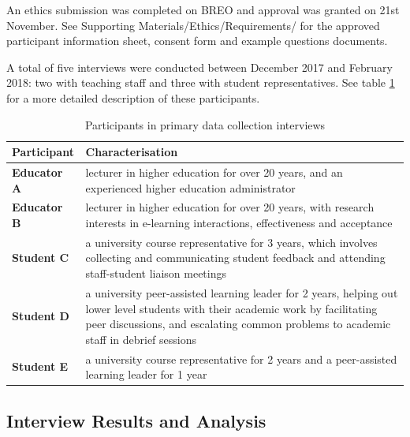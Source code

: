 An ethics submission was completed on BREO and approval was granted on 21st November.
See Supporting Materials/Ethics/Requirements/ for the approved 
participant information sheet, consent form and example questions documents.

A total of five interviews were conducted between December 2017 and February 2018:
two with teaching staff and three with student representatives. See table
\ref{table:participants-req} for a more detailed description of these participants.

\begin{table}[!h]
	\caption{Participants in primary data collection interviews}
	\centering
	\label{table:participants-req}
	\begin{tabularx}{\textwidth}{>{\bfseries}lX}
		Participant & Characterisation                                                                    \\
		\toprule
		Educator A  & lecturer in higher education for over 20 years, and an experienced higher education
		administrator                                                                                     \\\midrule
		Educator B  & lecturer in higher education for over 20 years, with research interests
		in e-learning interactions, effectiveness and acceptance                                          \\\midrule
		Student C   & a university course representative for 3 years, which involves collecting and
		communicating student feedback and attending staff-student liaison meetings                       \\\midrule
		Student D   & a university peer-assisted learning leader for 2 years, helping out lower level
		students with their academic work by facilitating peer discussions, and escalating common problems
		to academic staff in debrief sessions                                                             \\\midrule
		Student E   & a university course representative for 2 years and a peer-assisted learning leader
		for 1 year                                                                                        \\\bottomrule
	\end{tabularx}
\end{table}

\subsection{Interview Results and Analysis}

